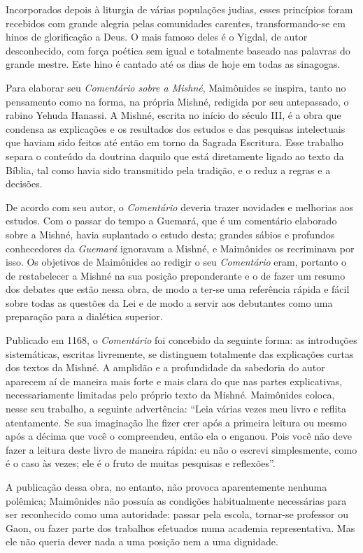 Incorporados depois à liturgia de várias populações judias, esses
princípios foram recebidos com grande alegria pelas comunidades
carentes, transformando-se em hinos de glorificação a Deus. O mais
famoso deles é o Yigdal, de autor desconhecido, com força poética sem
igual e totalmente baseado nas palavras do grande mestre. Este hino é
cantado até os dias de hoje em todas as sinagogas.

Para elaborar seu \emph{Comentário sobre a Mishné}, Maimônides se
inspira, tanto no pensamento como na forma, na própria Mishné,
redigida por
seu antepassado, o rabino Yehuda Hanassi. A Mishné, escrita no
início do século III, é a obra que condensa as explicações e os
resultados dos estudos e das pesquisas intelectuais que haviam sido
feitos até então em torno da Sagrada Escritura. Esse trabalho separa o
conteúdo da doutrina daquilo que está diretamente ligado ao texto da
Bíblia, tal como havia sido transmitido pela tradição, e o reduz a
regras e a decisões.

De acordo com seu autor, o \emph{Comentário} deveria trazer novidades e
melhorias aos estudos. Com o passar do tempo a Guemará, que é um
comentário elaborado sobre a Mishné, havia suplantado o estudo
desta; grandes sábios e profundos conhecedores da \emph{Guemará}
ignoravam a Mishné, e Maimônides os recriminava por isso. Os
objetivos de Maimônides ao redigir o seu \emph{Comentário} eram,
portanto o de restabelecer a Mishné na sua posição preponderante
e o de fazer um resumo dos debates que estão nessa obra, de modo a
ter-se uma referência rápida e fácil sobre todas as questões da Lei e de
modo a servir aos debutantes como uma preparação para a dialética
superior.

Publicado em 1168, o \emph{Comentário} foi concebido da seguinte forma:
as introduções sistemáticas, escritas livremente, se distinguem
totalmente das explicações curtas dos textos da Mishné. A
amplidão e a profundidade da sabedoria do autor aparecem aí de maneira
mais forte e mais clara do que nas partes explicativas, necessariamente
limitadas pelo próprio texto da Mishné. Maimônides coloca, nesse
seu trabalho, a seguinte advertência: ``Leia várias vezes meu livro e
reflita atentamente. Se sua imaginação lhe fizer crer após a primeira
leitura ou mesmo após a décima que você o compreendeu, então ela o
enganou. Pois você não deve fazer a leitura deste livro de maneira
rápida: eu não o escrevi simplesmente, como é o caso às vezes; ele é o
fruto de muitas pesquisas e reflexões''.

A publicação dessa obra, no entanto, não provoca aparentemente nenhuma
polêmica; Maimônides não possuía as condições habitualmente necessárias
para ser reconhecido como uma autoridade: passar pela escola, tornar-se
professor ou Gaon, ou fazer parte dos trabalhos efetuados numa academia
representativa. Mas ele não queria dever nada a uma posição nem a uma
dignidade.

